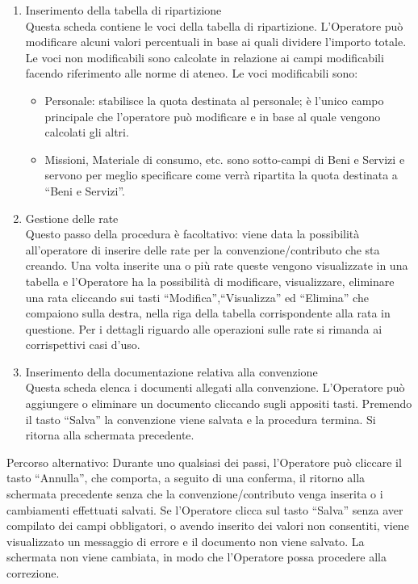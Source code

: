 \begin{enumerate}
\begin{enumerate}
    \item Inserimento della tabella di ripartizione\\
     
      Questa scheda contiene le voci della tabella di ripartizione. L'Operatore può modificare alcuni valori percentuali 
      in base ai quali dividere l'importo totale. Le voci non modificabili sono calcolate in relazione ai campi modificabili facendo riferimento alle norme di ateneo. Le voci modificabili sono:
      \begin{itemize}
	\item Personale: stabilisce la quota destinata al personale; è l'unico campo principale che l'operatore può modificare e in base al quale vengono calcolati gli altri.
	\item Missioni, Materiale di consumo, etc. sono sotto-campi di Beni e Servizi e servono per meglio specificare come verrà ripartita la quota destinata a ``Beni e Servizi''.
      \end{itemize}
    \item Gestione delle rate\\
      
      Questo passo della procedura è facoltativo: viene data la possibilità all'operatore di inserire delle rate per la convenzione/contributo
      che sta creando. Una volta inserite una o più rate
      queste vengono visualizzate in una tabella e l'Operatore
      ha la possibilità di modificare, visualizzare, eliminare una rata cliccando sui tasti ``Modifica'',``Visualizza'' ed ``Elimina'' che compaiono sulla destra, nella riga della tabella
       corrispondente alla rata in questione. Per i dettagli riguardo alle operazioni sulle rate si rimanda ai corrispettivi casi d'uso.

      
    \item Inserimento della documentazione relativa alla convenzione\\
	  
	  Questa scheda elenca i documenti allegati alla convenzione. L'Operatore può aggiungere o eliminare un documento 
	  cliccando sugli appositi tasti. Premendo il tasto ``Salva'' la convenzione viene salvata e la procedura termina. Si ritorna alla schermata precedente.
  \end{enumerate}
		 
  Percorso alternativo:
  Durante uno qualsiasi dei passi, l'Operatore può cliccare il tasto ``Annulla'', che comporta, a seguito di una conferma, il ritorno alla schermata precedente
  senza che la convenzione/contributo venga inserita o i cambiamenti effettuati salvati.
  Se l'Operatore clicca sul tasto ``Salva'' senza aver compilato dei campi obbligatori, o avendo inserito dei valori non consentiti, viene visualizzato un messaggio di errore 
  e il documento non viene salvato. La schermata non viene cambiata, in modo che l'Operatore possa procedere alla correzione.
     

\end{enumerate}
